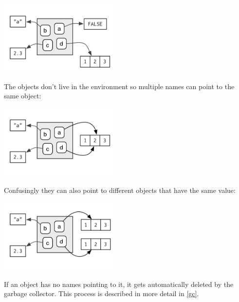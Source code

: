 \documentclass[oneside]{book}
\newenvironment{Shaded}{}{}
\newcommand{\DecValTok}  [1]{\textcolor[rgb]{0.25,0.63,0.44}{{#1}}}
\newcommand{\StringTok}  [1]{\textcolor[rgb]{0.25,0.44,0.63}{{#1}}}
\newcommand{\NormalTok}  [1]{{#1}}
\renewcommand{\hyperref}[2][???]{\autoref{#1}}
\begin{document}
\includegraphics[width=2.36in,height=1.47in]{diagrams/environments.png/bindings.png}

The objects don't live in the environment so multiple names can point to
the same object:

\begin{Shaded}
\end{Shaded}

\includegraphics[width=2.36in,height=1.47in]{diagrams/environments.png/multiple-names.png}

Confusingly they can also point to different objects that have the same
value:

\begin{Shaded}
\end{Shaded}

\includegraphics[width=2.36in,height=1.47in]{diagrams/environments.png/copies.png}

If an object has no names pointing to it, it gets automatically deleted
by the garbage collector. This process is described in more detail in
\hyperref[gc]{gc}.
\end{document}

